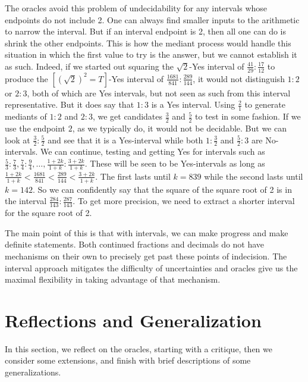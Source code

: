 \documentclass[12pt]{article}
\begin{document}
The oracles avoid this problem of undecidability for any intervals whose endpoints do not include 2. One can always find smaller inputs to the arithmetic to narrow the interval. But if an interval endpoint is 2, then all one can do is shrink the other endpoints. This is how the mediant process would handle this situation in which the first value to try is the answer, but we cannot establish it as such. Indeed, if we started out squaring the $\sqrt{2}$-Yes interval of $\frac{41}{29}:\frac{17}{12}$ to produce the $[(\sqrt{2})^2=T]$-Yes interval of $\frac{1681}{841}:\frac{289}{144}$, it would not distinguish $1:2$ or $2:3$, both of which are Yes intervals, but not seen as such from this interval representative. But it does say that $1:3$ is a Yes interval. Using $\frac{2}{1}$ to generate mediants of $1:2$ and $2:3$, we get candidates $\frac{3}{2}$ and $\frac{5}{2}$ to test in some fashion. If we use the endpoint $2$, as we typically do, it would not be decidable. But we can look at $\frac{3}{2}:\frac{5}{2}$ and see that it is a Yes-interval while both $1:\frac{3}{2}$ and $\frac{5}{2}:3$ are No-intervals. We can continue, testing and getting Yes for intervals such as $\frac{5}{3}:\frac{7}{3}, \frac{7}{4}:\frac{9}{4}, \ldots, \frac{1 + 2k}{1+k}:\frac{3+2k}{1+k}$. These will be seen to be Yes-intervals as long as $\frac{1+2k}{1+k} < \frac{1681}{841} < \frac{289}{144} < \frac{3+2k}{1+k}$. The first lasts until $k=839$ while the second lasts until $k=142$. So we can confidently say that the square of the square root of 2 is in the interval $\frac{284}{143}:\frac{287}{143}$. To get more precision, we need to extract a shorter interval for the square root of 2. 

The main point of this is that with intervals, we can make progress and make definite statements. Both continued fractions and decimals do not have mechanisms on their own to precisely get past these points of indecision. The interval approach mitigates the difficulty of uncertainties and oracles give us the maximal flexibility in taking advantage of that mechanism.



\section{Reflections and Generalization}

In this section, we reflect on the oracles, starting with a critique, then we consider some extensions, and finish with brief descriptions of some generalizations. 
\end{document}
